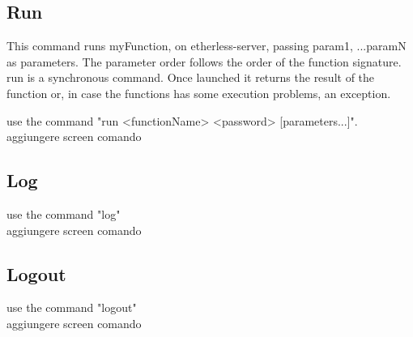 \subsection{Run}
This command runs myFunction, on etherless-server, passing param1, ...paramN as parameters. The parameter order follows the order of the function signature. run is a synchronous command. Once launched it returns the result of the function or, in case the functions has some execution problems, an exception. 

use the command "run <functionName> <password> [parameters...]". 
\\
aggiungere screen comando

\subsection{Log}
use the command "log"\\
aggiungere screen comando

\subsection{Logout}
use the command "logout"
\\aggiungere screen comando


